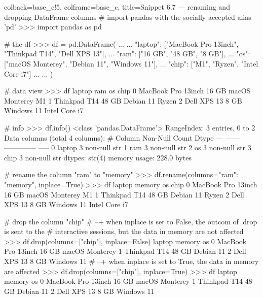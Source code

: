 \documentclass[a4paper,11pt]{book}
\begin{document}
\begin{pythoncode}[linenos=True]{colback=base_c!5, colframe=base_c, title=\sffamily Snippet 6.7 --- renaming and dropping DataFrame columns}
# import pandas with the socially accepted alias 'pd'
>>> import pandas as pd

# the df
>>> df = pd.DataFrame(
... 	{
... 	    "laptop": ["MacBook Pro 13inch", "Thinkpad T14", "Dell XPS 13"],
... 	    "ram": ["16 GB", "48 GB", "8 GB"],
... 	    "os": ["macOS Monterey", "Debian 11", "Windows 11"],
... 	    "chip": ["M1", "Ryzen", "Intel Core i7"]
... 	}
...     )

# data view
>>> df
               laptop    ram              os           chip
0  MacBook Pro 13inch  16 GB  macOS Monterey             M1
1        Thinkpad T14  48 GB       Debian 11          Ryzen
2         Dell XPS 13   8 GB      Windows 11  Intel Core i7

# info
>>> df.info()
<class 'pandas.DataFrame'>
RangeIndex: 3 entries, 0 to 2
Data columns (total 4 columns):
 #   Column  Non-Null Count  Dtype
---  ------  --------------  -----
 0   laptop  3 non-null      str  
 1   ram     3 non-null      str  
 2   os      3 non-null      str  
 3   chip    3 non-null      str  
dtypes: str(4)
memory usage: 228.0 bytes

# rename the column "ram" to "memory"
>>> df.rename(columns={"ram": "memory"}, inplace=True)
>>> df
               laptop memory              os           chip
0  MacBook Pro 13inch  16 GB  macOS Monterey             M1
1        Thinkpad T14  48 GB       Debian 11          Ryzen
2         Dell XPS 13   8 GB      Windows 11  Intel Core i7

# drop the column "chip"
# --+ when inplace is set to False, the outcom of .drop is sent to the
# interactive sessions, but the data in memory are not affected
>>> df.drop(columns=["chip"], inplace=False)
               laptop memory              os
0  MacBook Pro 13inch  16 GB  macOS Monterey
1        Thinkpad T14  48 GB       Debian 11
2         Dell XPS 13   8 GB      Windows 11
# --+ when inplace is set to True, the data in memory are affected
>>> df.drop(columns=["chip"], inplace=True)
>>> df
               laptop memory              os
0  MacBook Pro 13inch  16 GB  macOS Monterey
1        Thinkpad T14  48 GB       Debian 11
2         Dell XPS 13   8 GB      Windows 11
\end{pythoncode}
\clearpage
\end{document}
